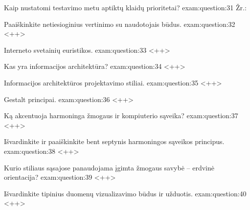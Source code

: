 \begin{question}{%
  Kaip nustatomi testavimo metu aptiktų klaidų prioritetai?
  }{exam:question:31}
  Žr.: \cite[20--22]{skaidres-10}
\end{question}

\begin{question}{%
  Paaiškinkite netiesioginius vertinimo su naudotojais būdus.
  }{exam:question:32}
  <++>
\end{question}

\begin{question}{%
  Interneto svetainių euristikos.
  }{exam:question:33}
  <++>
\end{question}

\begin{question}{%
  Kas yra informacijos architektūra?
  }{exam:question:34}
  <++>
\end{question}

\begin{question}{%
  Informacijos architektūros projektavimo stiliai.
  }{exam:question:35}
  <++>
\end{question}

\begin{question}{%
  Gestalt principai.
  }{exam:question:36}
  <++>
\end{question}

\begin{question}{%
  Ką akcentuoja harmoninga žmogaus ir kompiuterio sąveika?
  }{exam:question:37}
  <++>
\end{question}

\begin{question}{%
  Išvardinkite ir paaiškinkite bent septynis harmoningos sąveikos
  principus.
  }{exam:question:38}
  <++>
\end{question}

\begin{question}{%
  Kurio stiliaus sąsajose panaudojama įgimta žmogaus savybė – erdvinė
  orientacija?
  }{exam:question:39}
  <++>
\end{question}

\begin{question}{%
  Išvardinkite tipinius duomenų vizualizavimo būdus ir užduotis.
  }{exam:question:40}
  <++>
\end{question}
